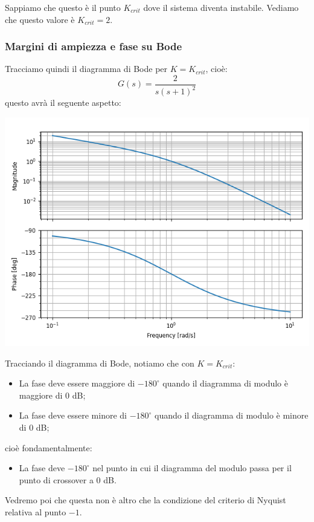 \documentclass[a4paper,11pt]{article}
\begin{document}
Sappiamo che questo è il punto $K_{crit}$ dove il sistema diventa instabile.
Vediamo che questo valore è $K_{crit} = 2$.

\subsubsection{Margini di ampiezza e fase su Bode}

Tracciamo quindi il diagramma di Bode per $K = K_{crit}$, cioè:
$$
G(s) = \frac{2}{s(s + 1)^2}
$$
questo avrà il seguente aspetto:
\begin{center}
	\includegraphics[scale=0.8]{../figures/bode_margin.png}
\end{center}

Tracciando il diagramma di Bode, notiamo che con $K = K_{crit}$:
\begin{itemize}
	\item La fase deve essere maggiore di $-180^\circ$ quando il diagramma di modulo è maggiore di 0 dB;
	\item La fase deve essere minore di $-180^\circ$ quando il diagramma di modulo è minore di 0 dB;
\end{itemize}
cioè fondamentalmente:
\begin{itemize}
	\item La fase deve $-180^\circ$ nel punto in cui il diagramma del modulo passa per il punto di crossover a 0 dB.
\end{itemize}

Vedremo poi che questa non è altro che la condizione del criterio di Nyquist relativa al punto $-1$.
\end{document}

